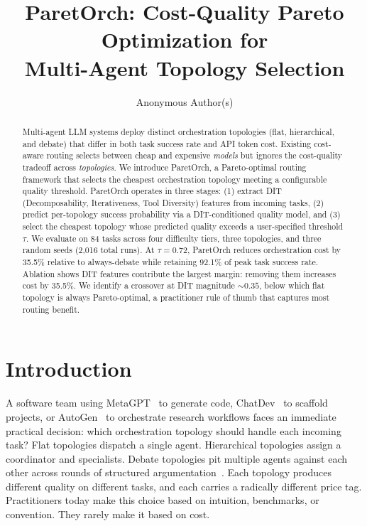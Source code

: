 \documentclass{article}
\title{ParetOrch: Cost-Quality Pareto Optimization for\\Multi-Agent Topology Selection}
\author{
  Anonymous Author(s)
}
\begin{document}
\maketitle

\begin{abstract}
Multi-agent LLM systems deploy distinct orchestration topologies (flat, hierarchical, and debate) that differ in both task success rate and API token cost. Existing cost-aware routing selects between cheap and expensive \emph{models} but ignores the cost-quality tradeoff across \emph{topologies}. We introduce ParetOrch, a Pareto-optimal routing framework that selects the cheapest orchestration topology meeting a configurable quality threshold. ParetOrch operates in three stages: (1) extract DIT (Decomposability, Iterativeness, Tool Diversity) features from incoming tasks, (2) predict per-topology success probability via a DIT-conditioned quality model, and (3) select the cheapest topology whose predicted quality exceeds a user-specified threshold $\tau$. We evaluate on 84 tasks across four difficulty tiers, three topologies, and three random seeds (2,016 total runs). At $\tau = 0.72$, ParetOrch reduces orchestration cost by 35.5\% relative to always-debate while retaining 92.1\% of peak task success rate. Ablation shows DIT features contribute the largest margin: removing them increases cost by 35.5\%. We identify a crossover at DIT magnitude ${\sim}0.35$, below which flat topology is always Pareto-optimal, a practitioner rule of thumb that captures most routing benefit.
\end{abstract}

\section{Introduction}
\label{sec:intro}

A software team using MetaGPT~\cite{hong2023metagpt} to generate code, ChatDev~\cite{qian2023chatdev} to scaffold projects, or AutoGen~\cite{wu2023autogen} to orchestrate research workflows faces an immediate practical decision: which orchestration topology should handle each incoming task? Flat topologies dispatch a single agent. Hierarchical topologies assign a coordinator and specialists. Debate topologies pit multiple agents against each other across rounds of structured argumentation~\cite{du2023debate}. Each topology produces different quality on different tasks, and each carries a radically different price tag. Practitioners today make this choice based on intuition, benchmarks, or convention. They rarely make it based on cost.
\end{document}
